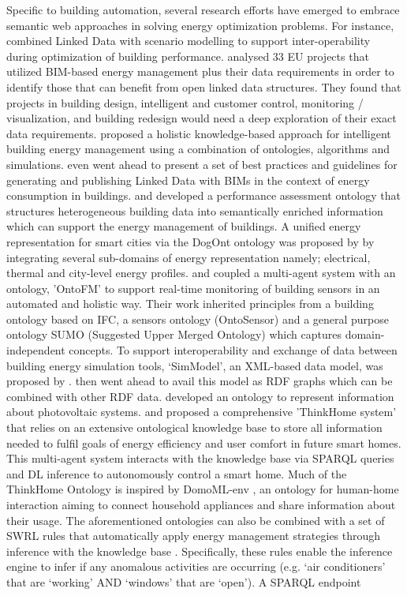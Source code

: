 Specific to building automation, several research efforts have emerged to embrace semantic web approaches in solving energy optimization problems. For instance, \cite{Curry2012} combined Linked Data with scenario modelling to support inter-operability during optimization of building performance. \cite{Msc2016} analysed 33 EU projects that utilized \ac{BIM}-based energy management plus their data requirements in order to identify those that can benefit from open linked data structures. They found that projects in building design, intelligent and customer control, monitoring / visualization, and building redesign would need a deep exploration of their exact data requirements. \cite{Anzaldi2014} proposed a holistic knowledge-based approach for intelligent building energy management using a combination of ontologies, algorithms and simulations.  \cite{Radulovic2015} even went ahead to present a set of best practices and guidelines for generating and publishing Linked Data with \acp{BIM} in the context of energy consumption in buildings. \cite{Corry2015} and \cite{Scherer2012} developed a performance assessment ontology that structures heterogeneous building data into semantically enriched information which can support the energy management of buildings. A unified energy representation for smart cities via the DogOnt ontology was proposed by \cite{Bonino2018} by integrating several sub-domains of energy representation namely; electrical, thermal and city-level energy profiles. \cite{Dibley2011} and \cite{Dibley2012} coupled a multi-agent system with an ontology, 'OntoFM' to support real-time monitoring of building sensors in an automated and holistic way. Their work inherited principles from a building ontology based on \ac{IFC}, a sensors ontology (OntoSensor) \citep{Russomanno2005} and a general purpose ontology SUMO (Suggested Upper Merged Ontology) \citep{Niles2001} which captures domain-independent concepts. To support interoperability and exchange of data between building energy simulation tools, `SimModel', an XML-based data model, was proposed by \cite{Donnell2011}.  \cite{Pauwels2014,Pauwels2014a} then went ahead to avail this model as \ac{RDF} graphs which can be combined with other \ac{RDF} data. \cite{Tah2011} developed an ontology to represent information about photovoltaic systems. \cite{Reinisch2011} and \cite{Kofler2012} proposed a comprehensive 'ThinkHome system' that relies on an extensive ontological knowledge base to store all information needed to fulfil goals of energy efficiency and user comfort in future smart homes. This multi-agent system interacts with the knowledge base via \ac{SPARQL} queries and \ac{DL} inference to autonomously control a smart home. Much of the ThinkHome Ontology is inspired by DomoML-env \citep{Sommaruga2005}, an ontology for human-home interaction aiming to connect household appliances and share information about their usage. The aforementioned ontologies can also be combined with a set of \ac{SWRL} rules that automatically apply energy management strategies through inference with the knowledge base \cite{Rossello-Busquet2011}. Specifically, these rules enable the inference engine to infer if any anomalous activities are occurring (e.g. `air conditioners' that are `working' AND `windows' that are `open'). A \ac{SPARQL} endpoint 